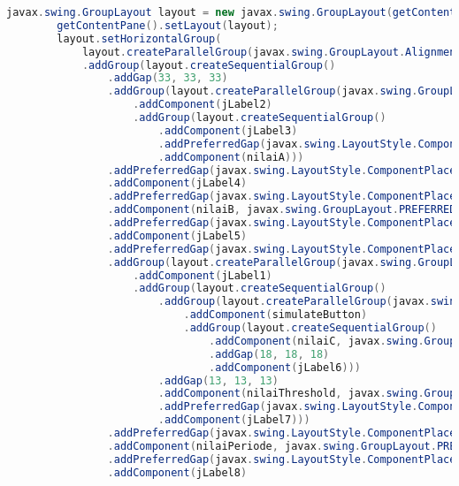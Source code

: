 \begin{lstlisting}[language=Java, caption=Entrepreneurs.java]
        javax.swing.GroupLayout layout = new javax.swing.GroupLayout(getContentPane());
        getContentPane().setLayout(layout);
        layout.setHorizontalGroup(
            layout.createParallelGroup(javax.swing.GroupLayout.Alignment.LEADING)
            .addGroup(layout.createSequentialGroup()
                .addGap(33, 33, 33)
                .addGroup(layout.createParallelGroup(javax.swing.GroupLayout.Alignment.LEADING, false)
                    .addComponent(jLabel2)
                    .addGroup(layout.createSequentialGroup()
                        .addComponent(jLabel3)
                        .addPreferredGap(javax.swing.LayoutStyle.ComponentPlacement.RELATED)
                        .addComponent(nilaiA)))
                .addPreferredGap(javax.swing.LayoutStyle.ComponentPlacement.RELATED)
                .addComponent(jLabel4)
                .addPreferredGap(javax.swing.LayoutStyle.ComponentPlacement.RELATED)
                .addComponent(nilaiB, javax.swing.GroupLayout.PREFERRED_SIZE, 29, javax.swing.GroupLayout.PREFERRED_SIZE)
                .addPreferredGap(javax.swing.LayoutStyle.ComponentPlacement.RELATED)
                .addComponent(jLabel5)
                .addPreferredGap(javax.swing.LayoutStyle.ComponentPlacement.RELATED)
                .addGroup(layout.createParallelGroup(javax.swing.GroupLayout.Alignment.LEADING)
                    .addComponent(jLabel1)
                    .addGroup(layout.createSequentialGroup()
                        .addGroup(layout.createParallelGroup(javax.swing.GroupLayout.Alignment.TRAILING)
                            .addComponent(simulateButton)
                            .addGroup(layout.createSequentialGroup()
                                .addComponent(nilaiC, javax.swing.GroupLayout.PREFERRED_SIZE, 31, javax.swing.GroupLayout.PREFERRED_SIZE)
                                .addGap(18, 18, 18)
                                .addComponent(jLabel6)))
                        .addGap(13, 13, 13)
                        .addComponent(nilaiThreshold, javax.swing.GroupLayout.PREFERRED_SIZE, 34, javax.swing.GroupLayout.PREFERRED_SIZE)
                        .addPreferredGap(javax.swing.LayoutStyle.ComponentPlacement.UNRELATED)
                        .addComponent(jLabel7)))
                .addPreferredGap(javax.swing.LayoutStyle.ComponentPlacement.UNRELATED)
                .addComponent(nilaiPeriode, javax.swing.GroupLayout.PREFERRED_SIZE, 37, javax.swing.GroupLayout.PREFERRED_SIZE)
                .addPreferredGap(javax.swing.LayoutStyle.ComponentPlacement.UNRELATED)
                .addComponent(jLabel8)

\end{lstlisting}
